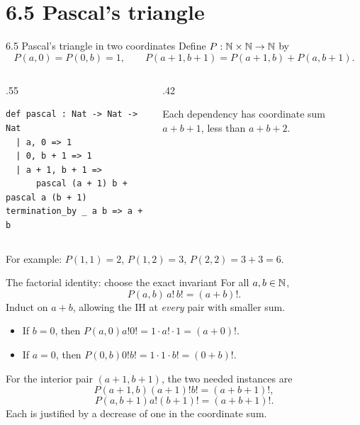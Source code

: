 \section{6.5 Pascal's triangle}
\begin{frame}[fragile]{6.5 Pascal's triangle in two coordinates}
Define $P:\mathbb{N}\times\mathbb{N}\to\mathbb{N}$ by
\[
 P(a,0)=P(0,b)=1,\qquad
 P(a+1,b+1)=P(a+1,b)+P(a,b+1).
\]
\begin{columns}[T]
\begin{column}{.55\textwidth}
\begin{lstlisting}
def pascal : Nat -> Nat -> Nat
  | a, 0 => 1
  | 0, b + 1 => 1
  | a + 1, b + 1 =>
      pascal (a + 1) b + pascal a (b + 1)
termination_by _ a b => a + b
\end{lstlisting}
\end{column}
\begin{column}{.42\textwidth}
\centering
{}

Each dependency has coordinate sum $a+b+1$, less than $a+b+2$.
\end{column}
\end{columns}
For example: $P(1,1)=2$, $P(1,2)=3$, $P(2,2)=3+3=6$.
\end{frame}

\begin{frame}{The factorial identity: choose the exact invariant}
For all $a,b\in\mathbb{N}$,
\[
 \boxed{P(a,b)\,a!\,b!=(a+b)!}.
\]
Induct on $a+b$, allowing the IH at \emph{every} pair with smaller sum.
\begin{itemize}
\item If $b=0$, then $P(a,0)a!0!=1\cdot a!\cdot1=(a+0)!$.
\item If $a=0$, then $P(0,b)0!b!=1\cdot1\cdot b!=(0+b)!$.
\end{itemize}
For the interior pair $(a+1,b+1)$, the two needed instances are
\[
 P(a+1,b)(a+1)!b!=(a+b+1)!,
\]
\[
 P(a,b+1)a!(b+1)!=(a+b+1)!.
\]
Each is justified by a decrease of one in the coordinate sum.
\end{frame}

